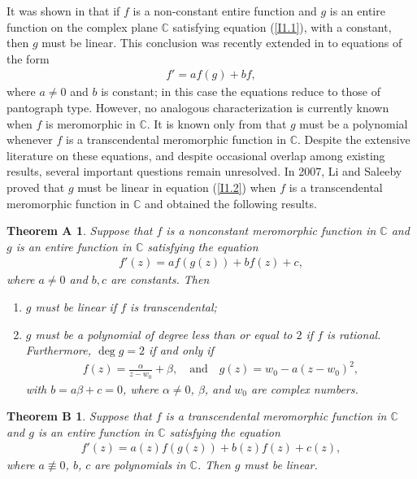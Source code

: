 \documentclass[11pt,reqno]{amsart}
\newtheorem*{theoA}{Theorem A}
\newtheorem*{theoB}{Theorem B}
\numberwithin{equation}{section}
\begin{document}
It was shown in \cite{G-1967} that if $f$ is a non-constant entire function and $g$ is an entire function on the complex plane $\mathbb{C}$ satisfying equation (\ref{I1.1}), with a constant, then $g$ must be linear. This conclusion was recently extended in \cite{BMW-2004} to equations of the form
\begin{align*}
f'=af(g)+bf,
\end{align*}
where $a\neq 0$ and $b$ is constant; in this case the equations reduce to those of pantograph type. However, no analogous characterization is currently known when $f$ is meromorphic in $\mathbb{C}$. It is known only from \cite{G-Y-1973} that $g$ must be a polynomial whenever $f$ is a transcendental meromorphic function in $\mathbb{C}$. 
Despite the extensive literature on these equations, and despite occasional overlap among existing results, several important questions remain unresolved. In 2007, Li and Saleeby \cite{Li-Saleeby-2007} proved that $g$ must be linear in equation (\ref{I1.2}) when $f$ is a transcendental meromorphic function in $\mathbb{C}$ and obtained the following results.

\begin{theoA}\cite[Theorem 2.1]{Li-Saleeby-2007} Suppose that $f$ is a nonconstant meromorphic function in $\mathbb{C}$ and $g$ is an entire function in $\mathbb{C}$ satisfying the equation
\begin{align*}
f'(z)=af(g(z))+bf(z)+c,
\end{align*}
where $a \neq 0$ and $b, c$ are constants. Then
\begin{enumerate}
\item[(i)] $g$ must be linear if $f$ is transcendental;
\item[(ii)] $g$ must be a polynomial of degree less than or equal to $2$ if $f$ is rational. Furthermore, $\deg g = 2$ if and only if
\begin{align*}
f(z)=\frac{\alpha}{z-w_0}+\beta,\quad \text{and}\quad
g(z)=w_0-a(z-w_0)^2,
\end{align*}
with $b=a\beta+c=0$, where $\alpha \neq 0$, $\beta$, and $w_0$ are complex numbers.
\end{enumerate}
\end{theoA}

\begin{theoB}\cite[Theorem 2.4]{Li-Saleeby-2007} Suppose that $f$ is a transcendental meromorphic function in $\mathbb{C}$ and $g$ is an entire function in $\mathbb{C}$ satisfying the equation
\begin{align*}
f'(z)=a(z)f(g(z))+b(z)f(z)+c(z),
\end{align*}
where $a\not\equiv 0$, $b$, $c$ are polynomials in $\mathbb{C}$. Then $g$ must be linear.
\end{theoB}
\end{document}

